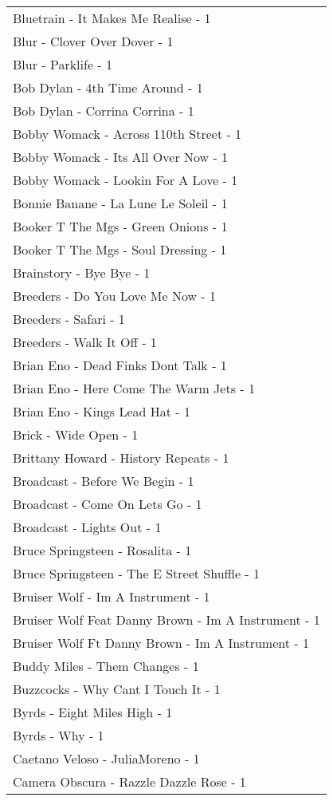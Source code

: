 \documentclass[
]{article}
\begin{document}
\begin{longtable}{l}
Bluetrain - It Makes Me Realise - 1 \\ 
Blur - Clover Over Dover - 1 \\ 
Blur - Parklife - 1 \\ 
Bob Dylan - 4th Time Around - 1 \\ 
Bob Dylan - Corrina Corrina - 1 \\ 
Bobby Womack - Across 110th Street - 1 \\ 
Bobby Womack - Its All Over Now - 1 \\ 
Bobby Womack - Lookin For A Love - 1 \\ 
Bonnie Banane - La Lune Le Soleil - 1 \\ 
Booker T The Mgs - Green Onions - 1 \\ 
Booker T The Mgs - Soul Dressing - 1 \\ 
Brainstory - Bye Bye - 1 \\ 
Breeders - Do You Love Me Now - 1 \\ 
Breeders - Safari - 1 \\ 
Breeders - Walk It Off - 1 \\ 
Brian Eno - Dead Finks Dont Talk - 1 \\ 
Brian Eno - Here Come The Warm Jets - 1 \\ 
Brian Eno - Kings Lead Hat - 1 \\ 
Brick - Wide Open - 1 \\ 
Brittany Howard - History Repeats - 1 \\ 
Broadcast - Before We Begin - 1 \\ 
Broadcast - Come On Lets Go - 1 \\ 
Broadcast - Lights Out - 1 \\ 
Bruce Springsteen - Rosalita - 1 \\ 
Bruce Springsteen - The E Street Shuffle - 1 \\ 
Bruiser Wolf - Im A Instrument - 1 \\ 
Bruiser Wolf Feat Danny Brown - Im A Instrument - 1 \\ 
Bruiser Wolf Ft Danny Brown - Im A Instrument - 1 \\ 
Buddy Miles - Them Changes - 1 \\ 
Buzzcocks - Why Cant I Touch It - 1 \\ 
Byrds - Eight Miles High - 1 \\ 
Byrds - Why - 1 \\ 
Caetano Veloso - JuliaMoreno - 1 \\ 
Camera Obscura - Razzle Dazzle Rose - 1 \\ 

\end{longtable}
\end{document}

